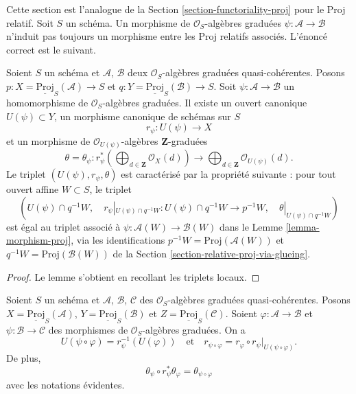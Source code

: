 \noindent
Cette section est l'analogue de la Section \ref{section-functoriality-proj}
pour le Proj relatif. Soit $S$ un schéma. Un morphisme de
$\mathcal{O}_S$-algèbres graduées $\psi : \mathcal{A} \to \mathcal{B}$
n'induit pas toujours un morphisme entre les Proj relatifs associés.
L'énoncé correct est le suivant.

\begin{lemma}
\label{lemma-morphism-relative-proj}
Soient $S$ un schéma et $\mathcal{A}$, $\mathcal{B}$ deux
$\mathcal{O}_S$-algèbres graduées quasi-cohérentes. Posons
$p : X = \underline{\text{Proj}}_S(\mathcal{A}) \to S$ et
$q : Y = \underline{\text{Proj}}_S(\mathcal{B}) \to S$.
Soit $\psi : \mathcal{A} \to \mathcal{B}$ un homomorphisme de
$\mathcal{O}_S$-algèbres graduées. Il existe un ouvert canonique
$U(\psi) \subset Y$, un morphisme canonique de schémas sur $S$
$$
r_\psi :
U(\psi)
\longrightarrow
X
$$
et un morphisme de $\mathcal{O}_{U(\psi)}$-algèbres $\mathbf{Z}$-graduées
$$
\theta = \theta_\psi :
r_\psi^*\left(
\bigoplus\nolimits_{d \in \mathbf{Z}} \mathcal{O}_X(d)
\right)
\longrightarrow
\bigoplus\nolimits_{d \in \mathbf{Z}} \mathcal{O}_{U(\psi)}(d).
$$
Le triplet $(U(\psi), r_\psi, \theta)$ est caractérisé par la propriété
suivante : pour tout ouvert affine $W \subset S$, le triplet
$$
(U(\psi) \cap q^{-1}W,\quad
r_\psi|_{U(\psi) \cap q^{-1}W} : U(\psi) \cap q^{-1}W \to p^{-1}W,\quad
\theta|_{U(\psi) \cap q^{-1}W})
$$
est égal au triplet associé à
$\psi : \mathcal{A}(W) \to \mathcal{B}(W)$ dans le
Lemme \ref{lemma-morphism-proj}, via les identifications
$p^{-1}W = \text{Proj}(\mathcal{A}(W))$ et
$q^{-1}W = \text{Proj}(\mathcal{B}(W))$ de la
Section \ref{section-relative-proj-via-glueing}.
\end{lemma}

\begin{proof}
Le lemme s'obtient en recollant les triplets locaux.
\end{proof}

\begin{lemma}
\label{lemma-morphism-relative-proj-transitive}
Soient $S$ un schéma et $\mathcal{A}$, $\mathcal{B}$, $\mathcal{C}$ des
$\mathcal{O}_S$-algèbres graduées quasi-cohérentes. Posons
$X = \underline{\text{Proj}}_S(\mathcal{A})$,
$Y = \underline{\text{Proj}}_S(\mathcal{B})$ et
$Z = \underline{\text{Proj}}_S(\mathcal{C})$.
Soient $\varphi : \mathcal{A} \to \mathcal{B}$ et
$\psi : \mathcal{B} \to \mathcal{C}$ des morphismes de
$\mathcal{O}_S$-algèbres graduées. On a
$$
U(\psi \circ \varphi) = r_\psi^{-1}(U(\varphi))
\quad
\text{et}
\quad
r_{\psi \circ \varphi}
=
r_\varphi \circ r_\psi|_{U(\psi \circ \varphi)}.
$$
De plus,
$$
\theta_\psi \circ r_\psi^*\theta_\varphi
=
\theta_{\psi \circ \varphi}
$$
avec les notations évidentes.
\end{lemma}

